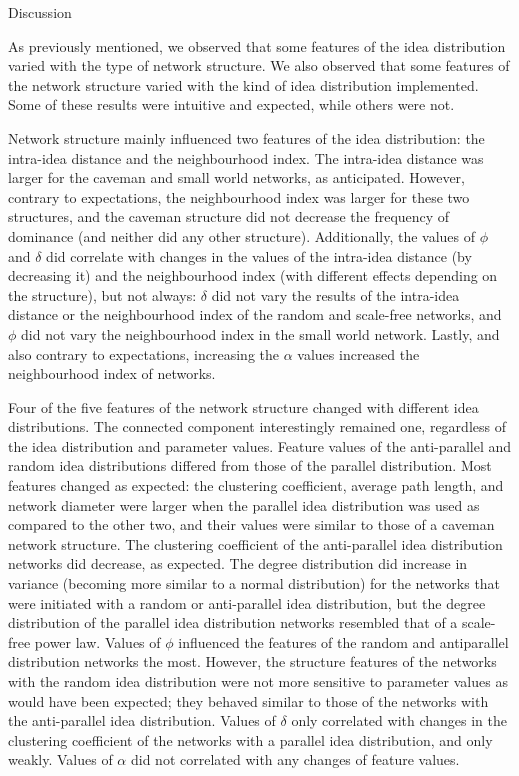 \documentclass{beamer}
\begin{document}
\begin{frame}
{Discussion}

As previously mentioned, we observed that some features of the idea distribution varied with the type of network structure. We also observed that some features of the network structure varied with the kind of idea distribution implemented. Some of these results were intuitive and expected, while others were not.

Network structure mainly influenced two features of the idea distribution: the intra-idea distance and the neighbourhood index. The intra-idea distance was larger for the caveman and small world networks, as anticipated. However, contrary to expectations, the neighbourhood index was larger for these two structures, and the caveman structure did not decrease the frequency of dominance (and neither did any other structure).  Additionally, the values of $\phi$ and $\delta$ did correlate with changes in the values of the intra-idea distance (by decreasing it) and the neighbourhood index (with different effects depending on the structure), but not always: $\delta$ did not vary the results of the intra-idea distance or the neighbourhood index of the random and scale-free networks, and $\phi$ did not vary the neighbourhood index in the small world network. Lastly, and also contrary to expectations, increasing the $\alpha$ values increased the neighbourhood index of networks.


Four of the five features of the network structure changed with different idea distributions. The connected component interestingly remained one, regardless of the idea distribution and parameter values. Feature values of the anti-parallel and random idea distributions differed from those of the parallel distribution. Most features changed as expected: the clustering coefficient, average path length, and network diameter were larger when the parallel idea distribution was used as compared to the other two, and their values were similar to those of a caveman network structure. The clustering coefficient of the anti-parallel idea distribution networks did decrease, as expected. The degree distribution did increase in variance (becoming more similar to a normal distribution) for the networks that were initiated with a random or anti-parallel idea distribution, but the degree distribution of the parallel idea distribution networks resembled that of a scale-free power law. Values of $\phi$ influenced the features of the random and antiparallel distribution networks the most. However, the structure features of the networks with the random idea distribution were not more sensitive to parameter values as would have been expected; they behaved similar to those of the networks with the anti-parallel idea distribution. Values of $\delta$ only correlated with changes in the clustering coefficient of the networks with a parallel idea distribution, and only weakly. Values of $\alpha$ did not correlated with any changes of feature values. 
\end{frame}
\end{document}
